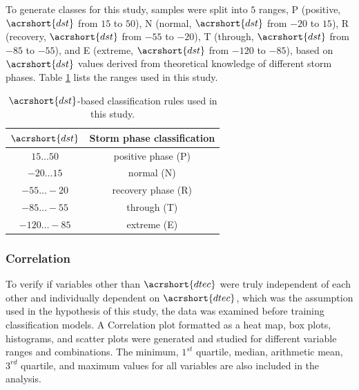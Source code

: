 \documentclass[sn-mathphys-num]{sn-jnl}%
\begin{document}
To generate classes for this study, samples were split into $5$ ranges, P (positive, $\acrshort{dst}$ from $15$ to $50$), N (normal, $\acrshort{dst}$ from $-20$ to $15$), R (recovery, $\acrshort{dst}$ from $-55$ to $-20$), T (through, $\acrshort{dst}$ from $-85$ to $-55$), and E (extreme, $\acrshort{dst}$ from $-120$ to $-85$), based on $\acrshort{dst}$ values derived from theoretical knowledge of different storm phases. Table \ref{tab:Dstranges} lists the ranges used in this study.

\begin{table}[!ht]
    \centering
    \caption{$\acrshort{dst}$-based classification rules used in this study.}
    \label{tab:Dstranges}
    \begin{tabular}{|c|c|}
        \hline
        $\acrshort{dst}$ & Storm phase classification \\ \hline
        $15\dots50$ & positive phase (P) \\ \hline
        $-20\dots15$ & normal (N) \\ \hline
        $-55\dots-20$ & recovery phase (R) \\ \hline
        $-85\dots-55$ & through (T) \\ \hline
        $-120\dots-85$ & extreme (E) \\ \hline
    \end{tabular}
\end{table}

\subsubsection{Correlation}

To verify if variables other than $\acrshort{dtec}$ were truly independent of each other and individually dependent on $\acrshort{dtec}$, which was the assumption used in the hypothesis of this study, the data was examined before training classification models. A Correlation plot formatted as a heat map, box plots, histograms, and scatter plots were generated and studied for different variable ranges and combinations. The minimum, $1^{st}$ quartile, median, arithmetic mean, $3^{rd}$ quartile, and maximum values for all variables are also included in the analysis.
\end{document}
